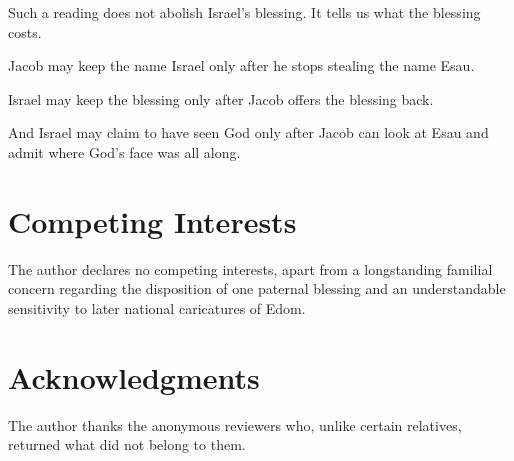 Such a reading does not abolish Israel's blessing. It tells us what the blessing costs.

Jacob may keep the name Israel only after he stops stealing the name Esau.

Israel may keep the blessing only after Jacob offers the blessing back.

And Israel may claim to have seen God only after Jacob can look at Esau and admit where God's face was all along.

\section*{Competing Interests}

The author declares no competing interests, apart from a longstanding familial concern regarding the disposition of one paternal blessing and an understandable sensitivity to later national caricatures of Edom.

\section*{Acknowledgments}

The author thanks the anonymous reviewers who, unlike certain relatives, returned what did not belong to them.

\printbibliography[title={References}]


